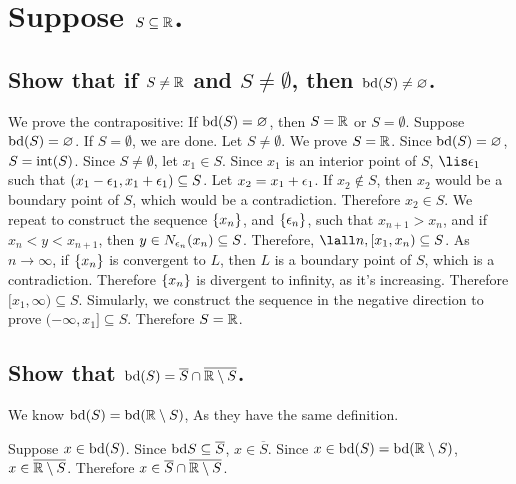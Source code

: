 \section{Suppose $S \subseteq \mathbb{R}$.}
    \subsection{Show that if $S \neq \mathbb{R}$ and $S \neq \emptyset$, then $\textrm{bd}(S) \neq \varnothing$.}
        We prove the contrapositive: 
        If $\textrm{bd}(S) = \varnothing$, then $S = \mathbb{R}$ or $S = \emptyset$.
        Suppose $\textrm{bd}(S) = \varnothing$.
        If $S = \emptyset$, we are done.
        Let $S \neq \emptyset$. We prove $S = \mathbb{R}$.
        Since $\textrm{bd}(S) = \varnothing$, $S = \textrm{int}(S)$.
        Since $S \neq \emptyset$, let $x_1 \in S$.
        Since $x_1$ is an interior point of $S$,
        $\lis \e_1$ such that $(x_1 - \epsilon_1, x_1 + \epsilon_1) \subseteq S$.
        Let $x_2 = x_1 + \epsilon_1$.
        If $x_2 \not\in S$, then $x_2$ would be a boundary point of $S$,
        which would be a contradiction.
        Therefore $x_2 \in S$.
        We repeat to construct the sequence $\{ x_n \}$, and $\{ \epsilon_n \}$,
        such that $x_{n+1} > x_n$, 
        and if $x_n < y < x_{n+1}$, then $y \in N_{\epsilon_n}(x_n) \subseteq S$.
        Therefore, $\lall n, [x_1, x_n) \subseteq S$.
        As $n \to \infty$, 
        if $\{ x_n \}$ is convergent to $L$, then $L$ is a boundary point of $S$,
        which is a contradiction.
        Therefore $\{ x_n \}$ is divergent to infinity, as it's increasing.
        Therefore $[x_1, \infty) \subseteq S$.
        Simularly, we construct the sequence in the negative direction to prove
        $(-\infty, x_1] \subseteq S$.
        Therefore $S = \mathbb{R}$.

    \subsection{Show that $\textrm{bd}(S) = \overline{S} \cap \overline{\mathbb{R} \setminus S}$.}
        We know $\textrm{bd}(S) = \textrm{bd}(\mathbb{R} \setminus S)$, 
        As they have the same definition.

            Suppose $x \in \textrm{bd}(S)$.
            Since $\textrm{bd}{S} \subseteq \overline S$,
            $x\in \overline S$.
            Since $x \in \textrm{bd}(S) = \textrm{bd}(\mathbb{R} \setminus S)$,
            $x \in \overline{\mathbb{R} \setminus S}$.
            Therefore $x \in \overline{S} \cap \overline{\mathbb{R} \setminus S}$.

